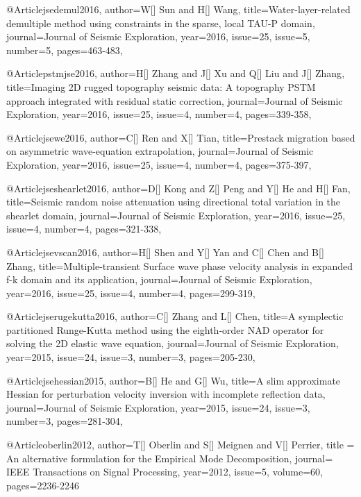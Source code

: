 @Article{jsedemul2016,
  author={W[] Sun and H[] Wang},
  title={Water-layer-related demultiple method using constraints in the sparse, local TAU-P domain},
  journal={Journal of Seismic Exploration},
  year=2016,
  issue=25,
  issue=5,
  number=5,
  pages={463-483},
}

@Article{pstmjse2016,
  author={H[] Zhang and J[] Xu and Q[] Liu and J[] Zhang},
  title={Imaging 2D rugged topography seismic data: A topography PSTM approach integrated with residual static correction},
  journal={Journal of Seismic Exploration},
  year=2016,
  issue=25,
  issue=4,
  number=4,
  pages={339-358},
}

@Article{jsewe2016,
  author={C[] Ren and X[] Tian},
  title={Prestack migration based on asymmetric wave-equation extrapolation},
  journal={Journal of Seismic Exploration},
  year=2016,
  issue=25,
  issue=4,
  number=4,
  pages={375-397},
}

@Article{jseshearlet2016,
  author={D[] Kong and Z[] Peng and Y[] He and H[] Fan},
  title={Seismic random noise attenuation using directional total variation in the shearlet domain},
  journal={Journal of Seismic Exploration},
  year=2016,
  issue=25,
  issue=4,
  number=4,
  pages={321-338},
}

@Article{jsevscan2016,
  author={H[] Shen and Y[] Yan and C[] Chen and B[] Zhang},
  title={Multiple-transient Surface wave phase velocity analysis in expanded f-k domain and its application},
  journal={Journal of Seismic Exploration},
  year=2016,
  issue=25,
  issue=4,
  number=4,
  pages={299-319},
}

@Article{jserugekutta2016,
  author={C[] Zhang and L[] Chen},
  title={A symplectic partitioned Runge-Kutta method using the eighth-order NAD operator for solving the 2D elastic wave equation},
  journal={Journal of Seismic Exploration},
  year=2015,
  issue=24,
  issue=3,
  number=3,
  pages={205-230},
}


@Article{jsehessian2015,
  author={B[] He and G[] Wu},
  title={A slim approximate Hessian for perturbation velocity inversion with incomplete reflection data},
  journal={Journal of Seismic Exploration},
  year=2015,
  issue=24,
  issue=3,
  number=3,
  pages={281-304},
}








@Article{oberlin2012,
  author={T[] Oberlin and S[] Meignen and V[] Perrier},
  title = { An alternative formulation for the Empirical Mode Decomposition},
  journal={ IEEE Transactions on Signal Processing},
  year=2012,
  issue=5,
  volume=60,
  pages=2236-2246}

